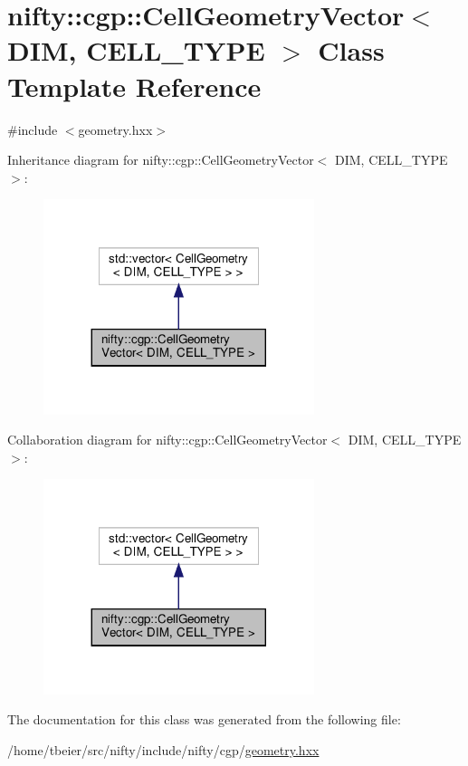 \hypertarget{classnifty_1_1cgp_1_1CellGeometryVector}{}\section{nifty\+:\+:cgp\+:\+:Cell\+Geometry\+Vector$<$ D\+IM, C\+E\+L\+L\+\_\+\+T\+Y\+PE $>$ Class Template Reference}
\label{classnifty_1_1cgp_1_1CellGeometryVector}


{\ttfamily \#include $<$geometry.\+hxx$>$}



Inheritance diagram for nifty\+:\+:cgp\+:\+:Cell\+Geometry\+Vector$<$ D\+IM, C\+E\+L\+L\+\_\+\+T\+Y\+PE $>$\+:
\nopagebreak
\begin{figure}[H]
\begin{center}
\leavevmode
\includegraphics[width=224pt]{classnifty_1_1cgp_1_1CellGeometryVector__inherit__graph}
\end{center}
\end{figure}


Collaboration diagram for nifty\+:\+:cgp\+:\+:Cell\+Geometry\+Vector$<$ D\+IM, C\+E\+L\+L\+\_\+\+T\+Y\+PE $>$\+:
\nopagebreak
\begin{figure}[H]
\begin{center}
\leavevmode
\includegraphics[width=224pt]{classnifty_1_1cgp_1_1CellGeometryVector__coll__graph}
\end{center}
\end{figure}


The documentation for this class was generated from the following file\+:\begin{DoxyCompactItemize}
\item 
/home/tbeier/src/nifty/include/nifty/cgp/\hyperlink{geometry_8hxx}{geometry.\+hxx}\end{DoxyCompactItemize}
